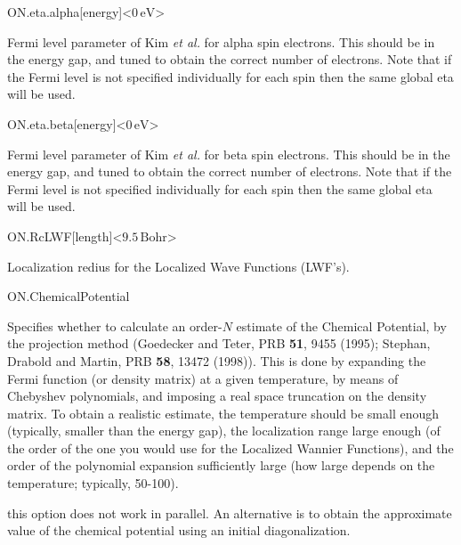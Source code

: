 \begin{fdfentry}{ON.eta.alpha}[energy]<$0\,\mathrm{eV}$>

  Fermi level parameter of Kim \textit{et al.} for alpha spin
  electrons.  This should be in the energy gap, and tuned to obtain
  the correct number of electrons. Note that if the Fermi level is not
  specified individually for each spin then the same global eta will
  be used.

\end{fdfentry}

\begin{fdfentry}{ON.eta.beta}[energy]<$0\,\mathrm{eV}$>

  Fermi level parameter of Kim \textit{et al.} for beta spin
  electrons.  This should be in the energy gap, and tuned to obtain
  the correct number of electrons. Note that if the Fermi level is not
  specified individually for each spin then the same global eta will
  be used.

\end{fdfentry}

\begin{fdfentry}{ON.RcLWF}[length]<$9.5\,\mathrm{Bohr}$>

  Localization redius for the Localized Wave Functions (LWF's).

\end{fdfentry}

\begin{fdflogicalF}{ON.ChemicalPotential}
  
  Specifies whether to calculate an order-$N$ estimate of the Chemical
  Potential, by the projection method (Goedecker and Teter, PRB
  \textbf{51}, 9455 (1995); Stephan, Drabold and Martin, PRB
  \textbf{58}, 13472 (1998)). This is done by expanding the Fermi
  function (or density matrix) at a given temperature, by means of
  Chebyshev polynomials, and imposing a
  real space truncation on the density matrix.  To obtain a realistic
  estimate, the temperature should be small enough (typically, smaller
  than the energy gap), the localization range large enough (of the
  order of the one you would use for the Localized Wannier Functions),
  and the order of the polynomial expansion sufficiently large (how
  large depends on the temperature; typically, 50-100).


  \note this option does not work in parallel. An alternative is to
  obtain the approximate value of the chemical potential using an
  initial diagonalization.

\end{fdflogicalF}


